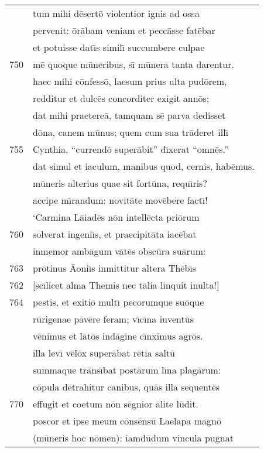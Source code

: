 \documentclass[paper=6in:9in,pagesize=pdftex,
               headinclude=on,footinclude=on,12pt]{scrbook}
\begin{document}
\begin{longtable}[p]{ r l }
 & tum mihi d\=esert\=o violentior ignis ad ossa\\ 
 & pervenit: \=or\=abam veniam et pecc\=asse fat\=ebar\\ 
 & et potuisse dat\={\i}s simil\={\i} succumbere culpae\\ 
750 & m\=e quoque m\=uneribus, s\={\i} m\=unera tanta darentur.\\ 
 & haec mihi c\=onfess\=o, laesum prius ulta pud\=orem,\\ 
 & redditur et dulc\=es concorditer exigit ann\=os;\\ 
 & dat mihi praetere\=a, tamquam s\=e parva dedisset\\ 
 & d\=ona, canem m\=unus; quem cum sua tr\=aderet ill\={\i}\\ 
755 & Cynthia, ``currend\=o super\=abit'' d\={\i}xerat ``omn\=es.''\\ 
 & dat simul et iaculum, manibus quod, cernis, hab\=emus.\\ 
 & m\=uneris alterius quae sit fort\=una, requ\={\i}ris?\\ 
 & accipe m\={\i}randum: novit\=ate mov\=ebere fact\={\i}!\\ 
 & \indent `Carmina L\=aiad\=es n\=on intell\=ecta pri\=orum\\ 
760 & solverat ingeni\={\i}s, et praecipit\=ata iac\=ebat\\ 
 & inmemor amb\=agum v\=at\=es obsc\=ura su\=arum:\\ 
763 & pr\=otinus \=Aoni\={\i}s inmittitur altera Th\=eb\={\i}s\\ 
762 & [sc\={\i}licet alma Themis nec t\=alia linquit inulta!]\\ 
764 & pestis, et exiti\=o mult\={\i} pecorumque su\=oque\\ 
 & r\=urigenae p\=av\=ere feram; v\={\i}c\={\i}na iuvent\=us\\ 
 & v\=enimus et l\=at\=os ind\=agine c\={\i}nximus agr\=os.\\ 
 & illa lev\={\i} v\=el\=ox super\=abat r\=etia salt\=u\\ 
 & summaque tr\=ans\={\i}bat post\=arum l\={\i}na plag\=arum:\\ 
 & c\=opula d\=etrahitur canibus, qu\=as illa sequent\=es\\ 
770 & effugit et coetum n\=on s\=egnior \=alite l\=udit.\\ 
 & poscor et ipse meum c\=ons\=ens\=u Laelapa magn\=o\\ 
 & (m\=uneris hoc n\=omen): iamd\=udum vincula pugnat\\ 

\end{longtable}
\end{document}
